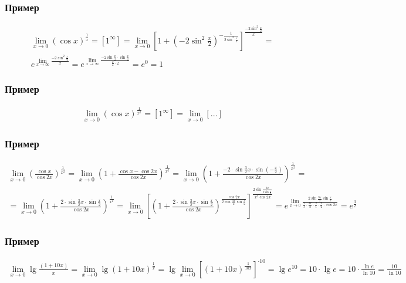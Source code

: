 \documentclass{article}
\begin{document}
\subsubsection{Пример}
\begin{gather*}
    \lim_{x \to 0} (\cos x)^{\frac{1}{x}} = 
    [1^\infty] =
    \lim_{x \to 0} \left[ 1 + \left(-2 \sin ^2 \frac{x}{2} \right)^{-\frac{1}{2 \sin ^2 \frac{x}{2}}} \right]^{\frac{-2 \sin ^2 \frac{x}{2}}{x}} = \\
    e^{\lim_{x \to \infty} \frac{-2 \sin ^2 \frac{x}{2}}{x}} = 
    e^{\lim_{x \to \infty} \frac{-2 \sin \frac{x}{2} \cdot \sin \frac{x}{2}}{\frac{x}{2} \cdot 2}} = e^0 = 1
\end{gather*}

\subsubsection{Пример}
\begin{gather*}
    \lim_{x \to 0} (\cos x)^{\frac{1}{x^2}} =
    [1^\infty] =
    \lim_{x \to 0} \left[ ... \right]
\end{gather*}

\subsubsection{Пример}
\begin{gather*}
    \lim_{x \to 0} \left( \frac{\cos x}{\cos 2x} \right)^{\frac{1}{x^2}} =
    \lim_{x \to 0} \left( 1 + \frac{\cos x - \cos 2x}{\cos 2x} \right)^{\frac{1}{x^2}} = 
    \lim_{x \to 0} \left( 1 + \frac{-2\cdot\sin \frac{3}{2} x\cdot\sin (-\frac{x}{2})}{\cos 2x} \right)^{\frac{1}{x^2}} = \\
    = \lim_{x \to 0} \left( 1 + \frac{2\cdot\sin \frac{3}{2}x\cdot\sin \frac{x}{2}}{\cos 2x} \right)^{\frac{1}{x^2}} =
    \lim_{x \to 0} \left[ \left( 1 + \frac{2\cdot\sin \frac{3}{2}x\cdot\sin \frac{x}{2}}{\cos 2x} \right)^{\frac{\cos 2x}{2 \cos \frac{3x}{2} \sin \frac{3}{2}}} \right]^{\frac{2 \sin \frac{3x}{2 \sin \frac{x}{2}}}{x^2 \cos 2x}} =
    e^{\lim_{x \to 0} \frac{2 \sin \frac{3x}{2} \sin \frac{x}{2}}{\frac{2}{3}\cdot\frac{3x}{2}\cdot\frac{2}{1}\cdot\frac{x}{2}\cdot\cos 2x}} =
    e^{\frac{3}{2}}
\end{gather*}

\subsubsection{Пример}
\begin{gather*}
    \lim_{x \to 0} \lg \frac{(1 + 10x)}{x} =
    \lim_{x \to 0} \lg (1 + 10x)^{\frac{1}{x}} =
    \lg \lim_{x \to 0} \left[ (1 + 10x)^{\frac{1}{10x}} \right]^{\cdot 10} =
    \lg e^{10} = 
    10 \cdot \lg e =
    10 \cdot \frac{\ln e}{\ln 10} =
    \frac{10}{\ln 10}
\end{gather*}
\end{document}
